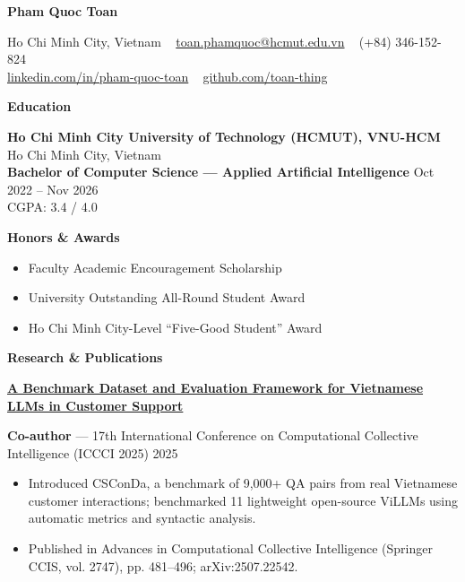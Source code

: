 \documentclass[10pt]{article}
\newcommand{\sep}{\textbullet\ }
\newcommand{\resumeSection}[1]{%
  \par\vspace{13pt}%
  {\centering\textbf{#1}\par}%
  \vspace{6pt}%
}
\newcommand{\resumeSubheading}[4]{%
  \textbf{#1} \hfill #2\\
  \textbf{#3} \hfill #4%
}
\begin{document}
\begin{center}
    \textbf{\LARGE Pham Quoc Toan}\\
    \vspace{4pt}
    \hrulefill
\end{center}

\begin{center}
    Ho Chi Minh City, Vietnam \sep
    \href{mailto:toan.phamquoc@hcmut.edu.vn}{toan.phamquoc@hcmut.edu.vn} \sep
    (+84) 346-152-824 \\
    \vspace{2pt}
    \href{https://www.linkedin.com/in/pham-quoc-toan}{linkedin.com/in/pham-quoc-toan} \sep
    \href{https://github.com/toan-thing}{github.com/toan-thing}
\end{center}

\resumeSection{Education}

\resumeSubheading
  {Ho Chi Minh City University of Technology (HCMUT), VNU-HCM}{Ho Chi Minh City, Vietnam}
  {Bachelor of Computer Science --- Applied Artificial Intelligence}{Oct 2022 -- Nov 2026}\\
CGPA: 3.4 / 4.0

\vspace{3pt}
\textbf{Honors \& Awards}
\begin{itemize}
    \item Faculty Academic Encouragement Scholarship
    \item University Outstanding All-Round Student Award
    \item Ho Chi Minh City-Level ``Five-Good Student'' Award
\end{itemize}

\resumeSection{Research \& Publications}

\textbf{\href{https://arxiv.org/abs/2507.22542}{A Benchmark Dataset and Evaluation Framework for Vietnamese LLMs in Customer Support}}

\textbf{Co-author} --- 17th International Conference on Computational Collective Intelligence (ICCCI 2025) \hfill 2025
\begin{itemize}
    \item Introduced CSConDa, a benchmark of 9,000+ QA pairs from real Vietnamese customer interactions; benchmarked 11 lightweight open-source ViLLMs using automatic metrics and syntactic analysis.
    \item Published in Advances in Computational Collective Intelligence (Springer CCIS, vol. 2747), pp. 481–496; arXiv:2507.22542.
\end{itemize}
\end{document}
